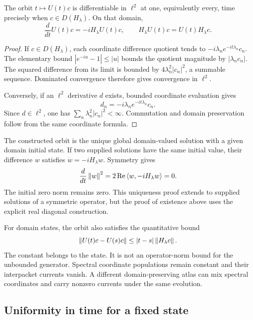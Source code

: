 \begin{proposition}
The orbit $t\mapsto U(t)c$ is differentiable in $\ell^2$ at one, equivalently every, time precisely when $c\in D(H_\lambda)$. On that domain,
\[
 \frac{d}{dt}U(t)c=-iH_\lambda U(t)c,
 \qquad H_\lambda U(t)c=U(t)H_\lambda c.
\]
\end{proposition}
\begin{proof}
If $c\in D(H_\lambda)$, each coordinate difference quotient tends to $-i\lambda_ne^{-it\lambda_n}c_n$. The elementary bound $|e^{-iu}-1|\leq|u|$ bounds the quotient magnitude by $|\lambda_nc_n|$. The squared difference from its limit is bounded by $4\lambda_n^2|c_n|^2$, a summable sequence. Dominated convergence therefore gives convergence in $\ell^2$.

Conversely, if an $\ell^2$ derivative $d$ exists, bounded coordinate evaluation gives
\[
 d_n=-i\lambda_ne^{-it\lambda_n}c_n.
\]
Since $d\in\ell^2$, one has $\sum_n\lambda_n^2|c_n|^2<\infty$. Commutation and domain preservation follow from the same coordinate formula.
\end{proof}

The constructed orbit is the unique global domain-valued solution with a given domain initial state. If two supplied solutions have the same initial value, their difference $w$ satisfies $\dot w=-iH_\lambda w$. Symmetry gives
\[
 \frac{d}{dt}\left\lVert w\right\rVert^2
 =2\operatorname{Re}\left\langle w,-iH_\lambda w\right\rangle=0.
\]
The initial zero norm remains zero. This uniqueness proof extends to supplied solutions of a symmetric operator, but the proof of existence above uses the explicit real diagonal construction.

For domain states, the orbit also satisfies the quantitative bound
\[
 \left\lVert U(t)c-U(s)c\right\rVert\leq|t-s|\left\lVert H_\lambda c\right\rVert.
\]
The constant belongs to the state. It is not an operator-norm bound for the unbounded generator. Spectral coordinate populations remain constant and their interpacket currents vanish. A different domain-preserving atlas can mix spectral coordinates and carry nonzero currents under the same evolution.


\subsection{Uniformity in time for a fixed state}

